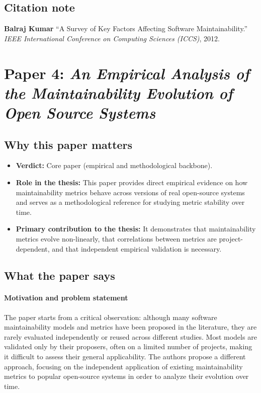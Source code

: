 \documentclass[11pt,a4paper]{article}
\begin{document}
\subsection{Citation note}
\noindent\textbf{Balraj Kumar} ``A Survey of Key Factors Affecting Software Maintainability.'' \textit{IEEE International Conference on Computing Sciences (ICCS)}, 2012.

\newpage
\section{Paper 4: \textit{An Empirical Analysis of the Maintainability Evolution of Open Source Systems}}

\subsection{Why this paper matters}
\begin{itemize}[leftmargin=*]
  \item \textbf{Verdict:} Core paper (empirical and methodological backbone).
  \item \textbf{Role in the thesis:} This paper provides direct empirical evidence on how maintainability metrics behave across versions of real open-source systems and serves as a methodological reference for studying metric stability over time.
  \item \textbf{Primary contribution to the thesis:} It demonstrates that maintainability metrics evolve non-linearly, that correlations between metrics are project-dependent, and that independent empirical validation is necessary.
\end{itemize}

\subsection{What the paper says}
\paragraph{Motivation and problem statement}
The paper starts from a critical observation: although many software maintainability models and metrics have been proposed in the literature, they are rarely evaluated independently or reused across different studies. Most models are validated only by their proposers, often on a limited number of projects, making it difficult to assess their general applicability. The authors propose a different approach, focusing on the independent application of existing maintainability metrics to popular open-source systems in order to analyze their evolution over time.
\end{document}
